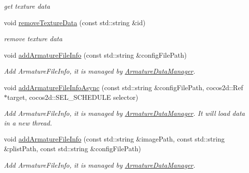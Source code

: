 \begin{DoxyCompactItemize}
\begin{DoxyCompactList}\small\item\em get texture data \end{DoxyCompactList}\item 
void \hyperlink{classcocostudio_1_1ArmatureDataManager_a53b3ec6a3d2264b4321be60b0cdeefc1}{remove\+Texture\+Data} (const std\+::string \&id)
\begin{DoxyCompactList}\small\item\em remove texture data \end{DoxyCompactList}\item 
\mbox{\label{classcocostudio_1_1ArmatureDataManager_a364290e4e2ae9420b51ca4076394e16c}} 
void \hyperlink{classcocostudio_1_1ArmatureDataManager_a364290e4e2ae9420b51ca4076394e16c}{add\+Armature\+File\+Info} (const std\+::string \&config\+File\+Path)
\begin{DoxyCompactList}\small\item\em Add Armature\+File\+Info, it is managed by \hyperlink{classcocostudio_1_1ArmatureDataManager}{Armature\+Data\+Manager}. \end{DoxyCompactList}\item 
\mbox{\label{classcocostudio_1_1ArmatureDataManager_ad7322691cd5f9944744ad6a474374710}} 
void \hyperlink{classcocostudio_1_1ArmatureDataManager_ad7322691cd5f9944744ad6a474374710}{add\+Armature\+File\+Info\+Async} (const std\+::string \&config\+File\+Path, cocos2d\+::\+Ref $\ast$target, cocos2d\+::\+S\+E\+L\+\_\+\+S\+C\+H\+E\+D\+U\+LE selector)
\begin{DoxyCompactList}\small\item\em Add Armature\+File\+Info, it is managed by \hyperlink{classcocostudio_1_1ArmatureDataManager}{Armature\+Data\+Manager}. It will load data in a new thread. \end{DoxyCompactList}\item 
\mbox{\label{classcocostudio_1_1ArmatureDataManager_aa2580efec928c88513b321b66b3977e0}} 
void \hyperlink{classcocostudio_1_1ArmatureDataManager_aa2580efec928c88513b321b66b3977e0}{add\+Armature\+File\+Info} (const std\+::string \&image\+Path, const std\+::string \&plist\+Path, const std\+::string \&config\+File\+Path)
\begin{DoxyCompactList}\small\item\em Add Armature\+File\+Info, it is managed by \hyperlink{classcocostudio_1_1ArmatureDataManager}{Armature\+Data\+Manager}. \end{DoxyCompactList}\item 

\end{DoxyCompactItemize}
